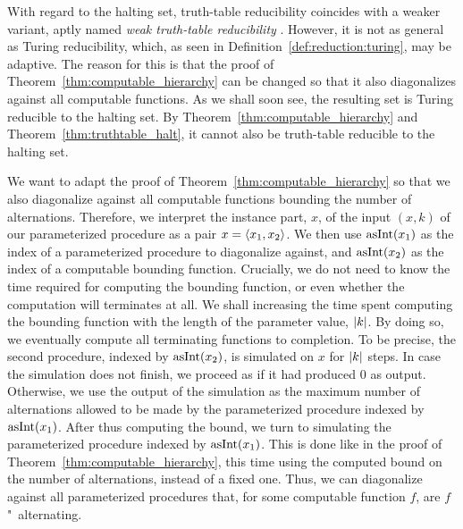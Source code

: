 With regard to the halting set, truth-table reducibility coincides with a weaker variant, aptly named \emph{weak truth-table reducibility} \parencite{odifreddi1992classical,downey2010algorithmic}.
However, it is not as general as Turing reducibility, which, as seen in Definition~\ref{def:reduction:turing}, may be adaptive.
The reason for this is that the proof of Theorem~\ref{thm:computable_hierarchy} can be changed so that it also diagonalizes against all computable functions.
As we shall soon see, the resulting set is Turing reducible to the halting set.
By Theorem~\ref{thm:computable_hierarchy} and Theorem~\ref{thm:truthtable_halt}, it cannot also be truth-table reducible to the halting set.

We want to adapt the proof of Theorem~\ref{thm:computable_hierarchy} so that we also diagonalize against all computable functions bounding the number of alternations.
Therefore, we interpret the instance part, $x$, of the input $(x, k)$ of our parameterized procedure as a pair $x = {\langle x_1, x_2\rangle}$.
We then use $\operatorname{asInt}(x_1)$ as the index of a parameterized procedure to diagonalize against, and $\operatorname{asInt}(x_2)$ as the index of a computable bounding function.
Crucially, we do not need to know the time required for computing the bounding function, or even whether the computation will terminates at all.
We shall increasing the time spent computing the bounding function with the length of the parameter value, ${\lvert k\rvert}$.
By doing so, we eventually compute all terminating functions to completion.
To be precise, the second procedure, indexed by $\operatorname{asInt}(x_2)$, is simulated on $x$ for ${\lvert k\rvert}$ steps.
In case the simulation does not finish, we proceed as if it had produced $0$ as output.
Otherwise, we use the output of the simulation as the maximum number of alternations allowed to be made by the parameterized procedure indexed by $\operatorname{asInt}(x_1)$.
After thus computing the bound, we turn to simulating the parameterized procedure indexed by $\operatorname{asInt}(x_1)$.
This is done like in the proof of Theorem~\ref{thm:computable_hierarchy}, this time using the computed bound on the number of alternations, instead of a fixed one.
Thus, we can diagonalize against all parameterized procedures that, for some computable function $f$, are $f$"~alternating.

